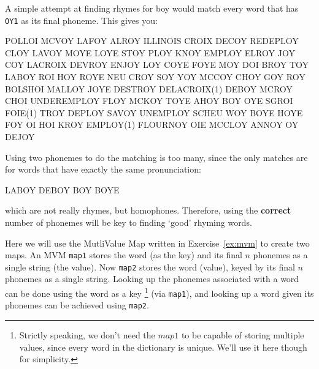 A simple attempt at finding rhymes for boy would match every word that has \verb^OY1^
as its final phoneme. This gives you:
\begin{terminaloutput}
POLLOI MCVOY LAFOY ALROY ILLINOIS CROIX DECOY REDEPLOY CLOY
LAVOY MOYE LOYE STOY PLOY KNOY EMPLOY ELROY JOY COY LACROIX
DEVROY ENJOY LOY COYE FOYE MOY DOI BROY TOY LABOY ROI HOY
ROYE NEU CROY SOY YOY MCCOY CHOY GOY ROY BOLSHOI MALLOY JOYE
DESTROY DELACROIX(1) DEBOY MCROY CHOI UNDEREMPLOY FLOY MCKOY
TOYE AHOY BOY OYE SGROI FOIE(1) TROY DEPLOY SAVOY UNEMPLOY
SCHEU WOY BOYE HOYE FOY OI HOI KROY EMPLOY(1) FLOURNOY OIE
MCCLOY ANNOY OY DEJOY
\end{terminaloutput}

Using two phonemes to do the matching is too many,
since the only matches are for words that have exactly the same pronunciation: 
\begin{terminaloutput}
LABOY DEBOY BOY BOYE
\end{terminaloutput}
which are not really rhymes, but homophones. Therefore, using
the {\bf correct} number of phonemes will be key to finding
`good' rhyming words.

Here we will use the MutliValue Map written in Exercise~\ref{ex:mvm} to
create two maps.  An MVM \verb^map1^ stores the word (as the key) and its final
$n$ phonemes as a single string (the value).  Now \verb^map2^ stores the
word (value), keyed by its final $n$ phonemes as a single string.
Looking up the phonemes associated with a word can be done using
the word as a key
\footnote{Strictly speaking, we don't need the
$map1$ to be capable of storing multiple values, since every word
in the dictionary is unique. We'll use it here though for simplicity.}
(via \verb^map1^), and looking up a word given its phonemes can be
achieved using \verb^map2^.

